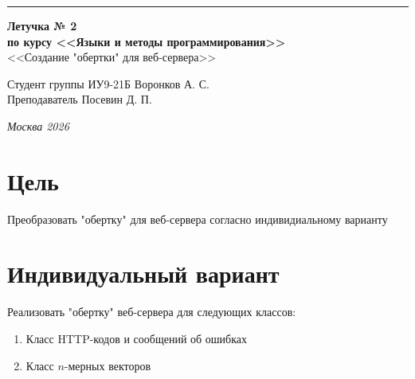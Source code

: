 \documentclass[a4paper, 14pt]{extarticle}
\begin{document}
\begin{titlepage}
\vspace*{-16pt}
\hspace{30pt}\rule{0.866\textwidth}{0.4pt}
  
\vspace{11em}

\begin{center}
\Large {\bf Летучка № 2} \\ 
\large {\bf по курсу <<Языки и методы программирования>>} \\ 
\large <<Создание "обертки" для веб-сервера>>
\end{center}\normalsize

\vspace{8em}


\begin{flushright}
  {Студент группы ИУ9-21Б Воронков А. С.\hspace*{15pt} \\
  \vspace{2ex}
  Преподаватель Посевин Д. П.\hspace*{15pt}}
\end{flushright}

\bigskip

\vfill
 

\begin{center}
\textsl{Москва 2026}
\end{center}
\end{titlepage}

\renewcommand{\ttdefault}{pcr}

\setlength{\tabcolsep}{3pt}
\newpage
\setcounter{page}{2}

\section{Цель}\label{Sect::task}
\par
Преобразовать "обертку"  для веб-сервера согласно индивидиальному варианту

\section{Индивидуальный вариант}
\par 
Реализовать "обертку" веб-сервера для следующих классов:
\begin{enumerate}
    \item Класс HTTP-кодов и сообщений об ошибках
    \item Класс $n$-мерных векторов
\end{enumerate}
\pagebreak
\end{document}
